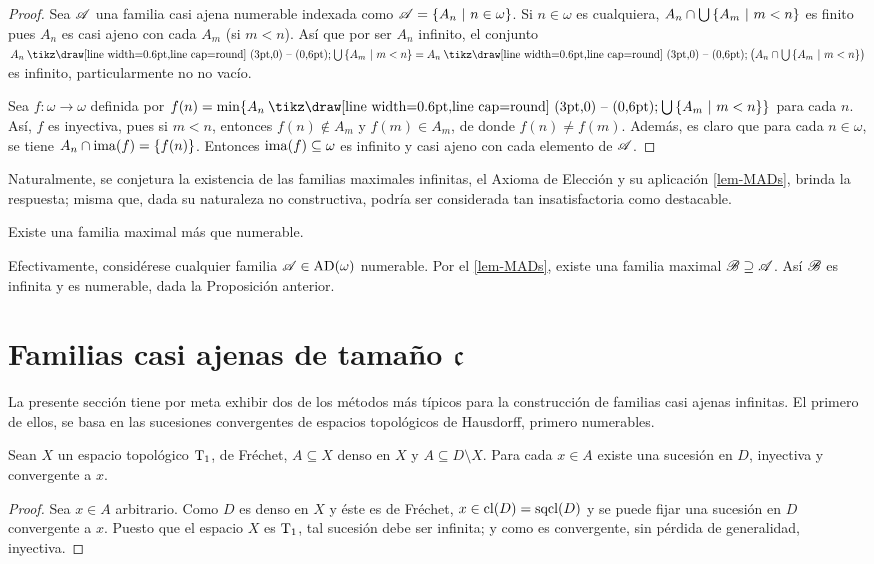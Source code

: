 \begin{proof}
	Sea $\mathscr{A}$ una familia casi ajena numerable indexada como $\mathscr{A}=\{A_n \text{ $|$ } n \in \omega\}$. Si $n \in \omega$ es cualquiera, $A_n \cap \mbox{$\bigcup$}\, \{A_m \text{ $|$ } m< n\}$ es finito pues $A_n$ es casi ajeno con cada $A_m$ (si $m<n$). Así que por ser $A_n$ infinito, el conjunto $A_n \setminus \midcup \{A_m \tq m<n\} = A_n \setminus \big( A_n \cap \midcup \{A_m \tq m<n\} \big)$ es infinito, particularmente no no vacío.

	Sea $f:\omega \to \omega$ definida por $f(n) = \min\{A_n \setminus \midcup \{A_m \tq m<n\}\}$ para cada $n$. Así, $f$ es inyectiva, pues si $m<n$, entonces $f(n) \notin A_m$ y $f(m) \in A_m$, de donde $f(n) \neq f(m)$. Además, es claro que para cada $n \in \omega$, se tiene $A_n \cap \operatorname{ima}(f) = \{f(n)\}$. Entonces $\operatorname{ima}(f) \subseteq \omega$ es infinito y casi ajeno con cada elemento de $\mathscr{A}$.
\end{proof}

Naturalmente, se conjetura la existencia de las familias maximales infinitas, el Axioma de Elección y su aplicación \ref{lem-MADs}, brinda la respuesta; misma que, dada su naturaleza no constructiva, podría ser considerada tan insatisfactoria como destacable.

\begin{observacion}\label{obs-ExisteNoNumMAD}
	Existe una familia maximal más que numerable.

	Efectivamente, considérese cualquier familia $\mathscr{A} \in \operatorname{AD}(\omega)$ numerable. Por el \autoref{lem-MADs}, existe una familia maximal $\mathscr{B} \supseteq \mathscr{A}$. Así $\mathscr{B}$ es infinita y es numerable, dada la Proposición anterior.
\end{observacion}

\section{Familias casi ajenas de tamaño \texorpdfstring{$\mathfrak{c}$}{c}}

La presente sección tiene por meta exhibir dos de los métodos más típicos para la construcción de familias casi ajenas infinitas. El primero de ellos, se basa en las sucesiones convergentes de espacios topológicos de Hausdorff, primero numerables.

\begin{lema}
	Sean $X$ un espacio topológico $\operatorname{T}_1$, de Fréchet, $A\subseteq X$ denso en $X$ y $A \subseteq D \setminus X$. Para cada $x \in A$ existe una sucesión en $D$, inyectiva y convergente a $x$.
\end{lema}
\begin{proof}
	Sea $x\in A$ arbitrario. Como $D$ es denso en $X$ y éste es de Fréchet, $x \in \operatorname{cl}(D)=\operatorname{sqcl}(D)$ y se puede fijar una sucesión en $D$ convergente a $x$. Puesto que el espacio $X$ es $\operatorname{T}_1$, tal sucesión debe ser infinita; y como es convergente, sin pérdida de generalidad, inyectiva.
\end{proof}

